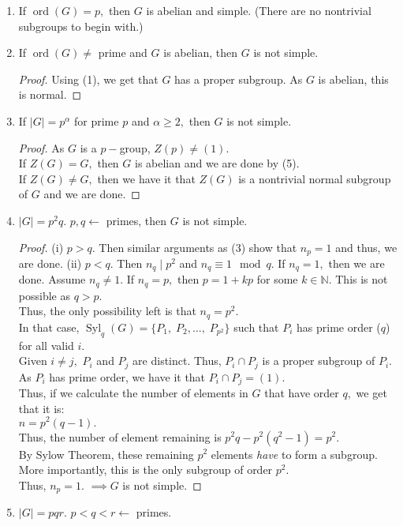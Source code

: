 \documentclass[12 pt, a4paper, toc=graduated, oneside]{article}
\theoremstyle{definition}
\newcommand{\Syl}{\operatorname{Syl}}
\newcommand{\ord}{\operatorname{ord}}
\begin{document}
\begin{enumerate}
	\item If $\ord(G) = p,$ then $G$ is abelian and simple. (There are no nontrivial subgroups to begin with.)
	\item If $\ord(G) \neq$ prime and $G$ is abelian, then $G$ is not simple.
	\begin{proof}
	Using (1), we get that $G$ has a proper subgroup. As $G$ is abelian, this is normal.
	\end{proof}
	\item If $|G| = p^\alpha$ for prime $p$ and $\alpha \ge 2,$ then $G$ is not simple.
	\begin{proof}
		As $G$ is a $p-$group, $Z(p) \neq (1).$\\
		If $Z(G) = G,$ then $G$ is abelian and we are done by (5).\\
		If $Z(G) \neq G,$ then we have it that $Z(G)$ is a nontrivial normal subgroup of $G$ and we are done.
	\end{proof}	
	\item $|G| = p^2q.$ $p, q \longleftarrow$ primes, then $G$ is not simple.
	\begin{proof}
		(i) $p > q.$ Then similar arguments as (3) show that $n_p = 1$ and thus, we are done.
		(ii) $p < q.$ Then $n_q \mid p^2$ and $n_q \equiv 1 \mod q.$ If $n_q = 1,$ then we are done. Assume $n_q \neq 1.$ If $n_q = p,$ then $p = 1 + kp$ for some $k \in \mathbb{N}.$ This is not possible as $q > p.$\\
		Thus, the only possibility left is that $n_q = p^2.$\\
		In that case, $\Syl_q(G) = \{P_1,\;P_2, \ldots,\; P_{p^2}\}$ such that $P_i$ has prime order ($q$) for all valid $i.$\\
		Given $i \neq j,$ $P_i$ and $P_j$ are distinct. Thus, $P_i \cap P_j$ is a proper subgroup of $P_i.$ As $P_i$ has prime order, we have it that $P_i \cap P_j = (1).$\\
		Thus, if we calculate the number of elements in $G$ that have order $q,$ we get that it is:\\
		$n = p^2(q - 1).$\\
		Thus, the number of element remaining is $p^2q - p^2(q^2 - 1) = p^2.$\\
		By Sylow Theorem, these remaining $p^2$ elements \emph{have} to form a subgroup. More importantly, this is the only subgroup of order $p^2.$ \\
		Thus, $n_p = 1.$ $\implies G$ is not simple.
	\end{proof}
	\item $|G| = pqr.$ $p < q < r \longleftarrow$ primes.\\

\end{enumerate}
\end{document}
